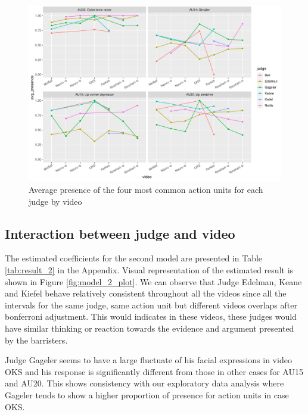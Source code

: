 \documentclass{monashthesis}
\begin{document}
\begin{figure}

{\centering \includegraphics[width=1\linewidth]{figures/unnamed-chunk-10-1} 

}

\caption{Average presence of the four most common action units for each judge by video\label{fig:common_video}}\label{fig:unnamed-chunk-10}
\end{figure}

\hypertarget{interaction-between-judge-and-video}{%
\subsection{Interaction between judge and video}\label{interaction-between-judge-and-video}}

The estimated coefficients for the second model are presented in Table \ref{tab:result_2} in the Appendix. Visual representation of the estimated result is shown in Figure \ref{fig:model_2_plot}. We can observe that Judge Edelman, Keane and Kiefel behave relatively consistent throughout all the videos since all the intervals for the same judge, same action unit but different videos overlaps after bonferroni adjustment. This would indicates in these videos, these judges would have similar thinking or reaction towards the evidence and argument presented by the barristers.

Judge Gageler seems to have a large fluctuate of his facial expressions in video OKS and his response is significantly different from those in other cases for AU15 and AU20. This shows consistency with our exploratory data analysis where Gageler tends to show a higher proportion of presence for action units in case OKS.
\end{document}
